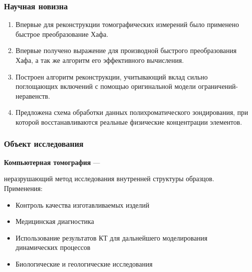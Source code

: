 \documentclass[12pt]{beamer}
\begin{document}

\begin{frame}
\frametitle{Научная новизна}
\begin{enumerate}
  \item Впервые для реконструкции томографических измерений было применено быстрое преобразование Хафа.
  \item Впервые получено выражение для производной быстрого преобразования Хафа, а так же алгоритм его эффективного вычисления.
  \item Построен алгоритм реконструкции, учитывающий вклад сильно поглощающих включений с помощью оригинальной модели ограничений-неравенств.
  \item Предложена схема обработки данных полихроматического зондирования, при которой восстанавливаются реальные физические концентрации элементов.
\end{enumerate}
\end{frame}


\begin{frame}
\frametitle{Объект исследования}
\textbf{Компьютерная томография} --- 

неразрушающий метод исследования внутренней структуры образцов.
\\ 
Применения:
\begin{itemize}
  \item Контроль качества изготавливаемых изделий
  \item Медицинская диагностика
  \item Использование результатов КТ для дальнейшего моделирования динамических процессов
  \item Биологические и геологические исследования
\end{itemize}

\end{frame}
\end{document}
